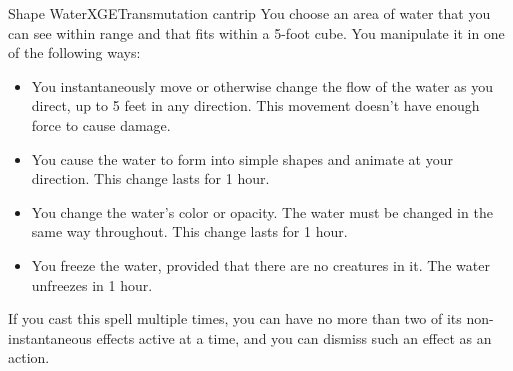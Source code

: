 \begin{spell}{Shape Water}{XGE}{Transmutation cantrip}
{
}
You choose an area of water that you can see within range
and that fits within a 5-foot cube. You manipulate it in
one of the following ways:
\begin{itemize}
\item You instantaneously move or otherwise change the flow
of the water as you direct, up to 5 feet in any direction.
This movement doesn't have enough force to cause damage.
\item You cause the water to form into simple shapes and
animate at your direction. This change lasts for 1 hour.
\item You change the water's color or opacity. The water
must be changed in the same way throughout. This change
lasts for 1 hour.
\item You freeze the water, provided that there are no
creatures in it. The water unfreezes in 1 hour.
\end{itemize}
If you cast this spell multiple times, you can have no more
than two of its non-instantaneous effects active at a time,
and you can dismiss such an effect as an action.
\end{spell}
